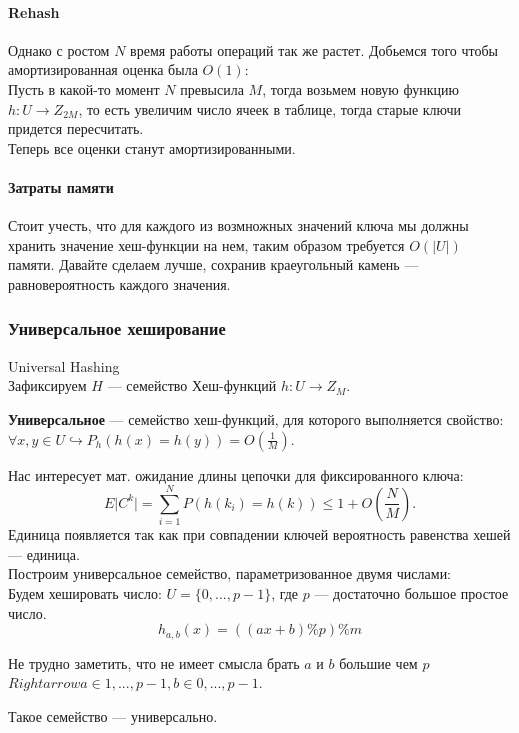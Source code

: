 \paragraph{Rehash}
Однако с ростом $N$ время работы операций так же растет. Добьемся того чтобы амортизированная оценка была  $O(1)$: \\
Пусть в какой-то момент  $N$ превысила  $M$, тогда возьмем новую функцию  $h: U \to Z_{2M}$, то есть увеличим число ячеек в таблице, 
тогда старые ключи придется пересчитать. \\ 
Теперь все оценки станут амортизированными. \\

\paragraph{Затраты памяти}
Стоит учесть, что для каждого из возмножных значений ключа мы должны хранить значение хеш-функции на нем,
таким образом требуется $O(\lvert U \rvert)$ памяти. Давайте сделаем лучше, сохранив краеугольный камень --- равновероятность каждого значения. 

\subsubsection{Универсальное хеширование}
Universal Hashing \\

Зафиксируем $H$ --- семейство Хеш-функций  $h: U \to Z_M$. \\
 \begin{Def}
     \textbf{Универсальное} --- семейство хеш-функций, для которого выполняется свойство: 
      $\forall x, y \in U \hookrightarrow P_h(h(x) = h(y)) = O(\frac{1}{M})$.
\end{Def}

Нас интересует мат. ожидание длины цепочки для фиксированного ключа:
\[
    E\lvert C^k \rvert = \sum \limits _{i = 1}^{N} P(h(k_i) = h(k)) \leq 1 + O(\frac{N}{M})
.\] 
Единица появляется так как при совпадении ключей вероятность равенства хешей --- единица. \\

Построим универсальное семейство, параметризованное двумя числами: \\
Будем хешировать число: $U = \{0, ..., p - 1\}$, где  $p$ --- достаточно большое простое число. \\
\[
    h_{a, b}(x) = ((ax + b) \% p) \% m
\]

Не трудно заметить, что не имеет смысла брать $a$ и  $b$ большие чем  $p$  $Rightarrow a \in {1, ..., p - 1}, b \in {0, ..., p - 1}$. \\
\begin{prop}
   Такое семейство --- универсально.
\end{prop}

